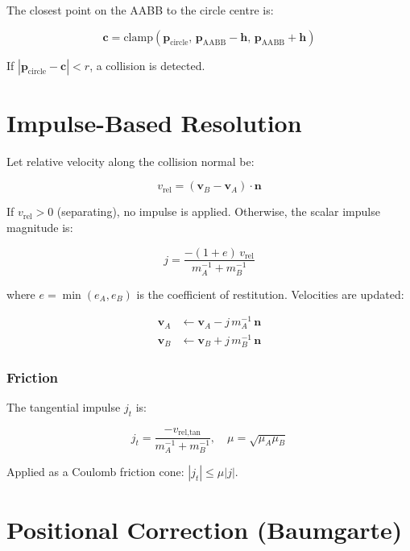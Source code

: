 \documentclass[12pt, a4paper]{report}
\theoremstyle{definition}
\theoremstyle{remark}
\begin{document}
The closest point on the AABB to the circle centre is:

\begin{equation}
\mathbf{c} = \text{clamp}(\mathbf{p}_\text{circle},\,
             \mathbf{p}_\text{AABB} - \mathbf{h},\,
             \mathbf{p}_\text{AABB} + \mathbf{h})
\end{equation}

If $|\mathbf{p}_\text{circle} - \mathbf{c}| < r$, a collision is detected.

\section{Impulse-Based Resolution}

Let relative velocity along the collision normal be:

\begin{equation}
v_\text{rel} = (\mathbf{v}_B - \mathbf{v}_A) \cdot \mathbf{n}
\end{equation}

If $v_\text{rel} > 0$ (separating), no impulse is applied.
Otherwise, the scalar impulse magnitude is:

\begin{equation}
j = \frac{-(1 + e)\, v_\text{rel}}{m_A^{-1} + m_B^{-1}}
\label{eq:impulse}
\end{equation}

where $e = \min(e_A, e_B)$ is the coefficient of restitution.
Velocities are updated:

\begin{align}
  \mathbf{v}_A &\leftarrow \mathbf{v}_A - j\,m_A^{-1}\,\mathbf{n} \\
  \mathbf{v}_B &\leftarrow \mathbf{v}_B + j\,m_B^{-1}\,\mathbf{n}
\end{align}

\subsubsection{Friction}

The tangential impulse $j_t$ is:

\begin{equation}
j_t = \frac{-v_\text{rel,tan}}{m_A^{-1} + m_B^{-1}},
\quad \mu = \sqrt{\mu_A \mu_B}
\end{equation}

Applied as a Coulomb friction cone: $|j_t| \leq \mu |j|$.

\section{Positional Correction (Baumgarte)}
\end{document}
